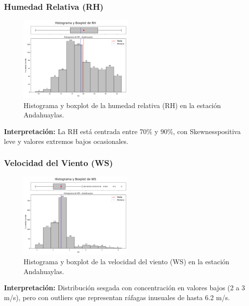 \subsubsection*{Humedad Relativa (RH)}
\begin{figure}[H]
\centering
\includegraphics[width=0.5\textwidth]{resultados/por_estacion_meteorologica/Andahuaylas/RH_histograma.png}
\caption{Histograma y boxplot de la humedad relativa (RH) en la estación Andahuaylas.}
\label{fig:andahuaylas_RH}
\end{figure}
\textbf{Interpretación:} La RH está centrada entre 70\% y 90\%, con Skewnesspositiva leve y valores extremos bajos ocasionales.

\subsubsection*{Velocidad del Viento (WS)}
\begin{figure}[H]
\centering
\includegraphics[width=0.5\textwidth]{resultados/por_estacion_meteorologica/Andahuaylas/WS_histograma.png}
\caption{Histograma y boxplot de la velocidad del viento (WS) en la estación Andahuaylas.}
\label{fig:andahuaylas_WS}
\end{figure}
\textbf{Interpretación:} Distribución sesgada con concentración en valores bajos (2 a 3 m/s), pero con outliers que representan ráfagas inusuales de hasta 6.2 m/s.

